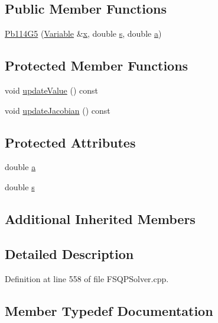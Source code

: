 \subsection*{Public Member Functions}
\begin{DoxyCompactItemize}
\item 
\hyperlink{classocra_1_1Pb114G5_a53ef7eb76deed9c8ca148f175f9bb8a6}{Pb114\+G5} (\hyperlink{classocra_1_1Variable}{Variable} \&\hyperlink{classocra_1_1Function_a28825886d1f149c87b112ec2ec1dd486}{x}, double \hyperlink{classocra_1_1Pb114G5_a97daa687d5cec8995656fa8787f8a89e}{s}, double \hyperlink{classocra_1_1Pb114G5_a36c7950fd1d7556715ae7e0749e88211}{a})
\end{DoxyCompactItemize}
\subsection*{Protected Member Functions}
\begin{DoxyCompactItemize}
\item 
void \hyperlink{classocra_1_1Pb114G5_ad9ce5a2a9f6af1cd1538056763bafccb}{update\+Value} () const 
\item 
void \hyperlink{classocra_1_1Pb114G5_a5f3d1a3005a540dcf44f53f31dd775b5}{update\+Jacobian} () const 
\end{DoxyCompactItemize}
\subsection*{Protected Attributes}
\begin{DoxyCompactItemize}
\item 
double \hyperlink{classocra_1_1Pb114G5_a36c7950fd1d7556715ae7e0749e88211}{a}
\item 
double \hyperlink{classocra_1_1Pb114G5_a97daa687d5cec8995656fa8787f8a89e}{s}
\end{DoxyCompactItemize}
\subsection*{Additional Inherited Members}


\subsection{Detailed Description}


Definition at line 558 of file F\+S\+Q\+P\+Solver.\+cpp.



\subsection{Member Typedef Documentation}
